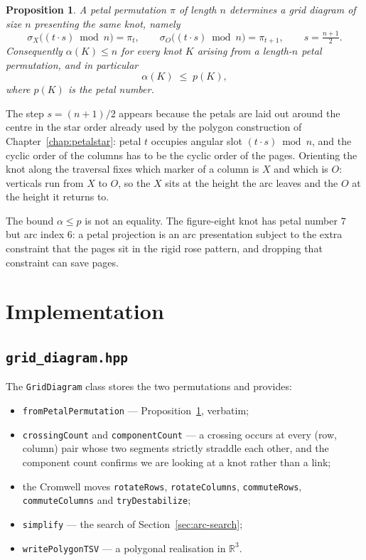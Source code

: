 \documentclass[11pt,oneside]{report}
\newtheorem{proposition}[theorem]{Proposition}
\theoremstyle{definition}
\newcommand{\R}{\mathbb{R}}
\begin{document}
\begin{proposition}\label{prop:petal-grid}
A petal permutation $\pi$ of length $n$ determines a grid diagram of size
$n$ presenting the same knot, namely
\[
\sigma_X\bigl((t \cdot s) \bmod n\bigr) = \pi_t,
\qquad
\sigma_O\bigl((t \cdot s) \bmod n\bigr) = \pi_{t+1},
\qquad s = \tfrac{n+1}{2}.
\]
Consequently $\alpha(K) \leq n$ for every knot $K$ arising from a length-$n$
petal permutation, and in particular
\[
\alpha(K) \;\leq\; p(K),
\]
where $p(K)$ is the petal number.
\end{proposition}

The step $s = (n+1)/2$ appears because the petals are laid out around the
centre in the star order already used by the polygon construction of
Chapter~\ref{chap:petalstar}: petal $t$ occupies angular slot
$(t \cdot s) \bmod n$, and the cyclic order of the columns has to be the
cyclic order of the pages. Orienting the knot along the traversal fixes
which marker of a column is $X$ and which is $O$: verticals run from $X$ to
$O$, so the $X$ sits at the height the arc leaves and the $O$ at the height
it returns to.

The bound $\alpha \leq p$ is not an equality. The figure-eight knot has
petal number $7$ but arc index $6$: a petal projection is an arc
presentation subject to the extra constraint that the pages sit in the
rigid rose pattern, and dropping that constraint can save pages.

\section{Implementation}

\subsection{\texttt{grid\_diagram.hpp}}

The \texttt{GridDiagram} class stores the two permutations and provides:
\begin{itemize}[leftmargin=2em]
\item \texttt{fromPetalPermutation} --- Proposition~\ref{prop:petal-grid},
verbatim;
\item \texttt{crossingCount} and \texttt{componentCount} --- a crossing
occurs at every (row, column) pair whose two segments strictly straddle
each other, and the component count confirms we are looking at a knot
rather than a link;
\item the Cromwell moves \texttt{rotateRows}, \texttt{rotateColumns},
\texttt{commuteRows}, \texttt{commuteColumns} and \texttt{tryDestabilize};
\item \texttt{simplify} --- the search of
Section~\ref{sec:arc-search};
\item \texttt{writePolygonTSV} --- a polygonal realisation in $\R^3$.
\end{itemize}
\end{document}
